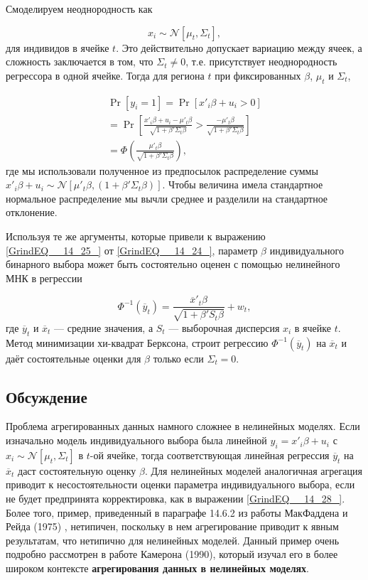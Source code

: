Смоделируем неоднородность как

\[
x_i \sim \mathcal{N}[\mu_t, \Sigma_t], 
\] 
для индивидов в ячейке $t$. Это действительно допускает вариацию между ячеек,  а сложность заключается в том,  что $\Sigma_t \ne 0$, т.е. присутствует неоднородность регрессора в одной ячейке. Тогда для региона $t$ при фиксированных $\beta$, $\mu_t$ и $\Sigma_t$, 

\begin{multline*}
\Pr[y_i = 1] = \Pr[x'_i\beta + u_i > 0] \\
=\Pr\left[\frac{x'_i\beta + u_i - \mu'_t\beta}{\sqrt{1+\beta'\Sigma_t\beta}} > \frac{-\mu'_t\beta}{\sqrt{1+\beta'\Sigma_t\beta}}\right] \\
=\Phi \left(\frac{\mu'_t\beta}{\sqrt{1+\beta'\Sigma_t\beta}}\right),
\end{multline*} 
где мы использовали полученное из предпосылок распределение суммы $x'_i \beta + u_i \sim \mathcal{N}[\mu'_t\beta,  (1+\beta'\Sigma_t \beta)]$. Чтобы величина имела стандартное нормальное распределение мы вычли среднее и разделили на стандартное отклонение.

Используя те же аргументы,  которые привели к выражению \eqref{GrindEQ__14_25_} от \eqref{GrindEQ__14_24_},   параметр $\beta$ индивидуального бинарного выбора может быть состоятельно оценен с помощью нелинейного МНК в регрессии

\begin{equation} 
\label{GrindEQ__14_28_} 
\Phi^{-1}(\overline{y}_t) = \frac{\overline{x}'_t\beta}{\sqrt{1+\beta'S_t \beta}} + w_t,  
\end{equation} 
где $\overline{y}_t$ и $\overline{x}_t$ --- средние значения,  а $S_t$ --- выборочная дисперсия $x_i$ в ячейке $t$. Метод минимизации хи-квадрат Берксона,  строит регрессию $\Phi^{-1}(\overline{y}_t)$ на $\overline{x}_t$ и даёт состоятельные оценки для $\beta$ только если $\Sigma_t=0.$

\subsection{Обсуждение}

Проблема агрегированных данных намного сложнее в нелинейных моделях. Если изначально модель индивидуального выбора была линейной $y_i = x'_i\beta + u_i$ с $x_i \sim \mathcal{N}\left[\mu_t, \Sigma_t\right]$ в $t$-ой ячейке,  тогда соответствующая линейная регрессия $\overline{y}_t$ на $\overline{x}_t$ даст состоятельную оценку $\beta $. Для нелинейных моделей аналогичная агрегация приводит к несостоятельности оценки параметра индивидуального выбора,  если не будет предпринята корректировка,  как в выражении \eqref{GrindEQ__14_28_}. Более того,  пример,  приведенный в параграфе 14.6.2 из работы МакФаддена и Рейда  (1975) ,  нетипичен,  поскольку в нем агрегирование  приводит к явным результатам, что нетипично для нелинейных моделей. Данный пример очень подробно рассмотрен в работе Камерона  (1990),  который изучал его в более широком контексте \textbf{агрегирования данных в нелинейных моделях}.

